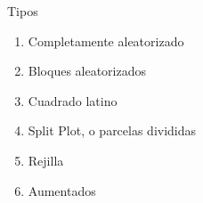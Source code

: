 \documentclass[
  11pt,
  ignorenonframetext,
]{beamer}
\begin{document}
\begin{frame}{Tipos}
\protect\hypertarget{tipos}{}
\begin{enumerate}
\item
  Completamente aleatorizado
\item
  Bloques aleatorizados
\item
  Cuadrado latino
\item
  Split Plot, o parcelas divididas
\item
  Rejilla
\item
  Aumentados
\end{enumerate}
\end{frame}
\end{document}
